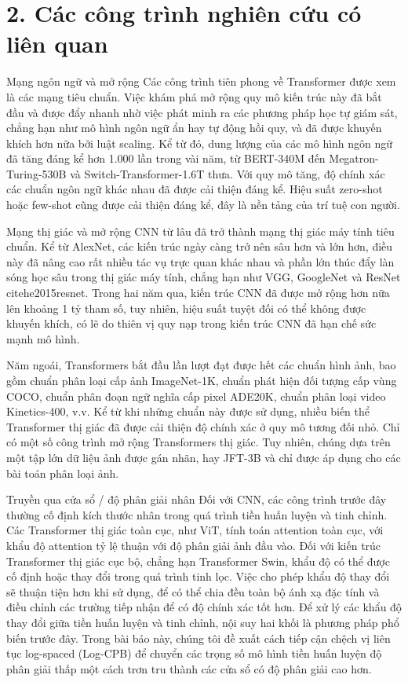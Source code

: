 \documentclass[times, twoside]{zHenriquesLab-StyleBioRxiv}
\begin{document}
\section*{2. Các công trình nghiên cứu có liên quan}

Mạng ngôn ngữ và mở rộng Các công trình tiên phong về Transformer được xem là các mạng tiêu chuẩn. Việc khám phá mở rộng quy mô kiến trúc này đã bắt đầu và được đẩy nhanh nhờ việc phát minh ra các phương pháp học tự giám sát, chẳng hạn như mô hình ngôn ngữ ẩn hay tự động hồi quy, và đã được khuyến khích hơn nữa bởi luật scaling. Kể từ đó, dung lượng của các mô hình ngôn ngữ đã tăng đáng kể hơn 1.000 lần trong vài năm, từ BERT-340M đến Megatron-Turing-530B và Switch-Transformer-1.6T thưa. Với quy mô tăng, độ chính xác các chuẩn ngôn ngữ khác nhau đã được cải thiện đáng kể. Hiệu suất zero-shot hoặc few-shot cũng được cải thiện đáng kể, đây là nền tảng của trí tuệ con người.

Mạng thị giác và mở rộng CNN từ lâu đã trở thành mạng thị giác máy tính tiêu chuẩn. Kể từ AlexNet, các kiến trúc ngày càng trở nên sâu hơn và lớn hơn, điều này đã nâng cao rất nhiều tác vụ trực quan khác nhau và phần lớn thúc đẩy làn sóng học sâu trong thị giác máy tính, chẳng hạn như VGG, GoogleNet và ResNet citehe2015resnet. Trong hai năm qua, kiến trúc CNN đã được mở rộng hơn nữa lên khoảng 1 tỷ tham số, tuy nhiên, hiệu suất tuyệt đối có thể không được khuyến khích, có lẽ do thiên vị quy nạp trong kiến trúc CNN đã hạn chế sức mạnh mô hình.

Năm ngoái, Transformers bắt đầu lần lượt đạt được hết các chuẩn hình ảnh, bao gồm chuẩn phân loại cấp ảnh ImageNet-1K, chuẩn phát hiện đối tượng cấp vùng COCO, chuẩn phân đoạn ngữ nghĩa cấp pixel ADE20K, chuẩn phân loại video Kinetics-400, v.v. Kể từ khi những chuẩn này được sử dụng, nhiều biến thể Transformer thị giác đã được cải thiện độ chính xác ở quy mô tương đối nhỏ. Chỉ có một số công trình mở rộng Transformers thị giác. Tuy nhiên, chúng dựa trên một tập lớn dữ liệu ảnh được gán nhãn, hay JFT-3B và chỉ được áp dụng cho các bài toán phân loại ảnh.

Truyền qua cửa sổ / độ phân giải nhân Đối với CNN, các công trình trước đây thường cố định kích thước nhân trong quá trình tiền huấn luyện và tinh chỉnh. Các Transformer thị giác toàn cục, như ViT, tính toán attention toàn cục, với khẩu độ attention tỷ lệ thuận với độ phân giải ảnh đầu vào. Đối với kiến trúc Transformer thị giác cục bộ, chẳng hạn Transformer Swin, khẩu độ có thể được cố định hoặc thay đổi trong quá trình tinh lọc. Việc cho phép khẩu độ thay đổi sẽ thuận tiện hơn khi sử dụng, để có thể chia đều toàn bộ ánh xạ đặc tính và điều chỉnh các trường tiếp nhận để có độ chính xác tốt hơn. Để xử lý các khẩu độ thay đổi giữa tiền huấn luyện và tinh chỉnh, nội suy hai khối là phương pháp phổ biến trước đây. Trong bài báo này, chúng tôi đề xuất cách tiếp cận chệch vị liên tục log-spaced (Log-CPB) để chuyển các trọng số mô hình tiền huấn luyện độ phân giải thấp một cách trơn tru thành các cửa sổ có độ phân giải cao hơn.
\end{document}
